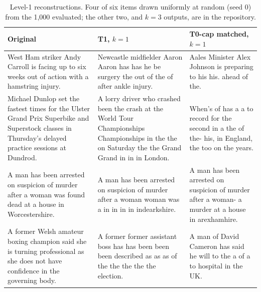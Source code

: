 \documentclass[11pt]{article}
\begin{document}
\begin{table}[t]
\centering
\scriptsize
\begin{tabularx}{\linewidth}{>{\raggedright\arraybackslash}X>{\raggedright\arraybackslash}X>{\raggedright\arraybackslash}X}
\toprule
Original & T1, $k{=}1$ & T0-cap matched, $k{=}1$ \\
\midrule
West Ham striker Andy Carroll is facing up to six weeks out of action with a hamstring injury. & Newcastle midfielder Aaron Aaron has has he be surgery the out of the of after ankle injury. & Aales Minister Alex Johnson is preparing to his his. ahead of the. \\
\addlinespace
Michael Dunlop set the fastest times for the Ulster Grand Prix Superbike and Superstock classes in Thursday's delayed practice sessions at Dundrod. & A lorry driver who crashed been the crash at the World Tour Championships Championships in the the on Saturday the the Grand Grand in in in London. & When's of has a a to record for the second in a the of the- his, in England, the too on the years. \\
\addlinespace
A man has been arrested on suspicion of murder after a woman was found dead at a house in Worcestershire. & A man has been arrested on suspicion of murder after a woman woman was a in in in in indearkshire. & A man has been arrested on suspicion of murder after a woman- a murder at a house in arexhamhire. \\
\addlinespace
A former Welsh amateur boxing champion said she is turning professional as she does not have confidence in the governing body. & A former former assistant boss has has been been been described as as as of the the the the the election. & A man of David Cameron has said he will to the a\textquotedbl{} of a to hospital in the UK. \\
\bottomrule
\end{tabularx}
\caption{Level-1 reconstructions. Four of six items drawn uniformly at random (seed 0) from the 1{,}000 evaluated; the other two, and $k{=}3$ outputs, are in the repository.}
\label{tab:examples}
\end{table}
\end{document}
